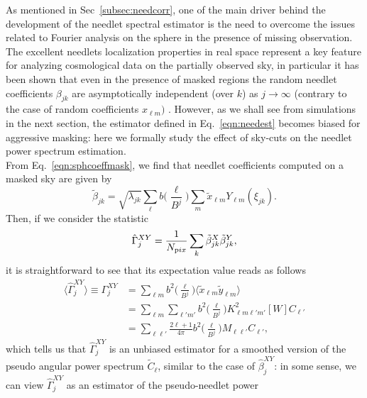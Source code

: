 As mentioned in Sec~\eqref{subsec:needcorr}, one of the main driver behind the development of the needlet spectral estimator is 
the need to overcome the issues related to Fourier analysis on the sphere in the presence of missing observation.
The excellent needlets localization properties in real space represent a key feature for analyzing cosmological data on the 
partially observed sky, in particular it has been shown that even in the presence of masked regions the random needlet coefficients 
$\beta_{jk}$ are asymptotically independent (over $k$) as $j \to \infty$ (contrary to the case of random coefficients $x_{\ell m})$ 
\citep{Marinucci2007, Baldi2009a}. However, as we shall see from simulations in the next section, the estimator defined in Eq.~\eqref{eqn:needest}
becomes biased for aggressive masking: here we formally study the effect of sky-cuts on the needlet power spectrum estimation.\\ 
From Eq.~\eqref{eqn:sphcoeffmask}, we find that needlet coefficients computed on a masked sky are given by
%
\begin{equation}
\label{eqn:needcoefmask}
\tilde{\beta}_{jk} = \sqrt{\lambda_{jk}} \sum_{\ell} b\biggl(\frac{\ell}{B^{j}}\biggr)\sum_{m}\tilde{x}_{\ell m}Y_{\ell m}(\xi_{jk}).
\end{equation}
%
Then, if we consider the statistic 
%
\begin{equation}
\label{eqn:gammaest}
\hat{\Gamma}^{XY}_j = \frac{1}{N_{\rm pix}} \sum_k \tilde{\beta}^X_{jk} \tilde{\beta}^Y_{jk},
\end{equation}
%
it is straightforward to see that its expectation value reads as follows
%
\begin{equation}
\label{eqn:gammaestmean}
\begin{split}
\langle \hat{\Gamma}^{XY}_j \rangle \equiv {\Gamma}^{XY}_j &= \sum_{\ell m} b^2\biggl(\frac{\ell}{B^{j}}\biggr) \langle \tilde{x}_{\ell m}\tilde{y}_{\ell m} \rangle \\
&= \sum_{\ell m} \sum_{\ell' m'} b^2\biggl(\frac{\ell}{B^{j}}\biggr) K^2_{\ell m \ell' m'}[W] C_{\ell'}\\
&= \sum_{\ell\ell'} \frac{2\ell+1}{{4\pi}} b^2\biggl(\frac{\ell}{B^{j}}\biggr) M_{\ell\ell'}C_{\ell'},
\end{split}
\end{equation}
%
which tells us that $\hat{\Gamma}^{XY}_j $ is an unbiased estimator for a smoothed version of the pseudo angular power spectrum $\tilde{C}_{\ell}$,
similar to the case of $\hat{\beta}^{XY}_j$: in some sense, we can view $\hat{\Gamma}^{XY}_j $ as an estimator of the pseudo-needlet power 
